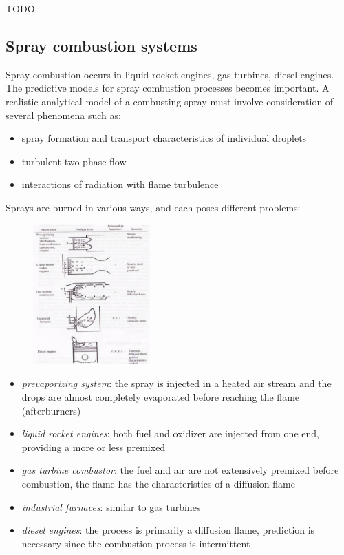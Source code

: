 \documentclass[12pt]{article}
\begin{document}
TODO

\subsection{Spray combustion systems}

Spray combustion occurs in liquid rocket engines, gas turbines, diesel engines. The predictive models for spray combustion processes becomes important. A realistic analytical model of a combusting spray must involve consideration of several phenomena such as:
\begin{itemize}
    \item spray formation and transport characteristics of individual droplets
    \item turbulent two-phase flow
    \item interactions of radiation with flame turbulence
\end{itemize}

Sprays are burned in various ways, and each poses different problems:

\begin{figure}[!ht]
\centering
\includegraphics[width=0.4\textwidth]{figures/spraycomb.png}
\end{figure}

\begin{itemize}
    \item \textit{prevaporizing system}: the spray is injected in a heated air stream and the drops are almost completely evaporated before reaching the flame (afterburners)
    \item \textit{liquid rocket engines}: both fuel and oxidizer are injected from one end, providing a more or less premixed
    \item \textit{gas turbine combustor}: the fuel and air are not extensively premixed before combustion, the flame has the characteristics of a diffusion flame
    \item \textit{industrial furnaces}: similar to gas turbines
    \item \textit{diesel engines}: the process is primarily a diffusion flame, prediction is necessary since the combustion process is intermittent
\end{itemize}
\end{document}
